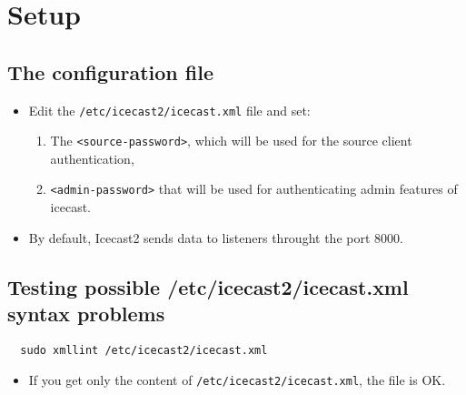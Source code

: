 
\chapter{Setup}

\section{The configuration file}

\begin{itemize}
\item Edit the \texttt{/etc/icecast2/icecast.xml} file and set:
\begin{enumerate}
\item The \texttt{<source-password>}, which will be used for the
  source client authentication,
\item \texttt{<admin-password>} that will be used for authenticating
  admin features of icecast.
\end{enumerate}
\item By default, Icecast2 sends data to listeners throught the port 8000.
\end{itemize}


\section{Testing possible /etc/icecast2/icecast.xml syntax problems}

\begin{lstlisting}
  sudo xmllint /etc/icecast2/icecast.xml
\end{lstlisting}
\begin{itemize}
\item If you get only the content of
  \texttt{/etc/icecast2/icecast.xml}, the file is OK.
\end{itemize}

